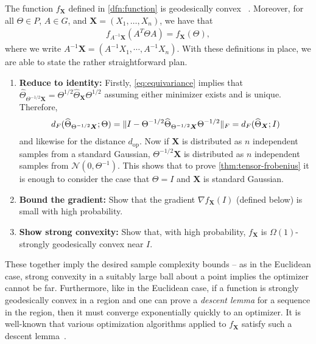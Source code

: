 \documentclass{article}
\DeclarePairedDelimiter{\norm}{\lVert}{\rVert}
\newcommand{\op}{\operatorname{op}}
\renewcommand{\vec}{\bm}
\newcommand\cN{\mathcal{N}}
\newcommand{\TODO}[1]{{\color{blue}[TODO: #1]}}
\begin{document}
The function $f_{\vec X}$ defined in \cref{dfn:function} is geodesically convex%
~\cite{burgisser2019towards}.
Moreover, for all $\Theta \in P$, $A \in G$, and $\vec X=(X_1,\dots,X_n)$, we have that
\begin{align}\label{eq:equivariance}
  f_{A^{-1} \vec X}(A^T \Theta A) = f_{\vec X}(\Theta),
\end{align}
where we write $A^{-1} \vec X = (A^{-1} X_1,\cdots,A^{-1} X_n)$.
With these definitions in place, we are able to state the rather straightforward plan.

\begin{enumerate}
\item\label{it:reduce} \textbf{Reduce to identity:}
Firstly, \cref{eq:equivariance} implies that $\widehat\Theta_{\Theta^{-1/2} \vec X} = \Theta^{1/2} \widehat\Theta_{\vec X} \Theta^{1/2}$ assuming either minimizer exists and is unique.
Therefore,
\begin{align*}
  d_F(\widehat\Theta_{\Theta^{-1/2} \vec X}; \Theta)
= \norm{ I - \Theta^{-1/2} \widehat\Theta_{\Theta^{-1/2} \vec X} \Theta^{-1/2} }_F
= d_F(\widehat\Theta_{\vec X}; I)
\end{align*}
and likewise for the distance $d_{\op}$.
Now if $\vec X$ is distributed as $n$ independent samples from a standard Gaussian, $\Theta^{-1/2} \vec X$ is distributed as $n$ independent samples from $\cN(0, \Theta^{-1})$.
This shows that to prove \cref{thm:tensor-frobenius} it is enough to consider the case that $\Theta = I$ and $\vec X$ is standard Gaussian.
\item\label{it:grad} \textbf{Bound the gradient:}
Show that the gradient $\nabla f_{\vec X}(I)$ (defined below) is small with high probability.
\item\label{it:convexity} \textbf{Show strong convexity:}
Show that, with high probability, $f_{\vec X}$ is $\Omega(1)$-strongly geodesically convex near $I$.
\end{enumerate}

These together imply the desired sample complexity bounds -- as in the Euclidean case, strong convexity in a suitably large ball about a point implies the optimizer cannot be far.
Furthermore, like in the Euclidean case, if a function is strongly geodesically convex in a region and one can prove a \emph{descent lemma} for a sequence in the region, then it must converge exponentially quickly to an optimizer.
It is well-known that various optimization algorithms applied to $f_{\vec X}$ satisfy such a descent lemma~\cite{burgisser2019towards}.
\end{document}
